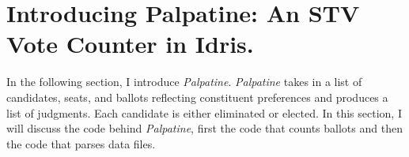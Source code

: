 \chapter{Introducing Palpatine: An STV Vote Counter in Idris.}

In the following section, I introduce \textit{Palpatine}. \textit{Palpatine}
takes in a list of candidates, seats, and ballots reflecting constituent
preferences and produces a list of judgments. Each candidate is either
eliminated or elected. In this section, I will discuss the code behind
\textit{Palpatine}, first the code that counts ballots and then the code that
parses data files. 


\newpage

\newpage

\newpage
